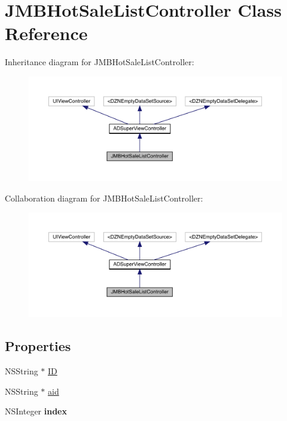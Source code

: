 \hypertarget{interface_j_m_b_hot_sale_list_controller}{}\section{J\+M\+B\+Hot\+Sale\+List\+Controller Class Reference}
\label{interface_j_m_b_hot_sale_list_controller}


Inheritance diagram for J\+M\+B\+Hot\+Sale\+List\+Controller\+:\nopagebreak
\begin{figure}[H]
\begin{center}
\leavevmode
\includegraphics[width=350pt]{interface_j_m_b_hot_sale_list_controller__inherit__graph}
\end{center}
\end{figure}


Collaboration diagram for J\+M\+B\+Hot\+Sale\+List\+Controller\+:\nopagebreak
\begin{figure}[H]
\begin{center}
\leavevmode
\includegraphics[width=350pt]{interface_j_m_b_hot_sale_list_controller__coll__graph}
\end{center}
\end{figure}
\subsection*{Properties}
\begin{DoxyCompactItemize}
\item 
N\+S\+String $\ast$ \mbox{\hyperlink{interface_j_m_b_hot_sale_list_controller_a647864f1d78271546f606df493a2bb12}{ID}}
\item 
N\+S\+String $\ast$ \mbox{\hyperlink{interface_j_m_b_hot_sale_list_controller_ac6a09aec88e4b218d4b5e8525fc5a79b}{aid}}
\item 
\mbox{\label{interface_j_m_b_hot_sale_list_controller_a600910217b322ce10752e5fad22690fc}} 
N\+S\+Integer {\bfseries index}
\end{DoxyCompactItemize}

